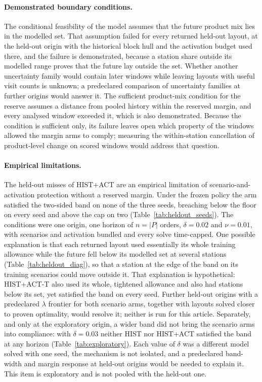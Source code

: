 \paragraph{Demonstrated boundary conditions.} The conditional feasibility of the model assumes that the future product mix lies in the modelled set. That assumption failed for every returned held-out layout, at the held-out origin with the historical block hull and the activation budget used there, and the failure is demonstrated, because a station share outside its modelled range proves that the future lay outside the set. Whether another uncertainty family would contain later windows while leaving layouts with useful visit counts is unknown; a predeclared comparison of uncertainty families at further origins would answer it. The sufficient product-mix condition for the reserve assumes a distance from pooled history within the reserved margin, and every analysed window exceeded it, which is also demonstrated. Because the condition is sufficient only, its failure leaves open which property of the windows allowed the margin arms to comply; measuring the within-station cancellation of product-level change on scored windows would address that question.

\paragraph{Empirical limitations.} The held-out misses of HIST+ACT are an empirical limitation of scenario-and-activation protection without a reserved margin. Under the frozen policy the arm satisfied the two-sided band on none of the three seeds, breaching below the floor on every seed and above the cap on two (Table~\ref{tab:heldout_seeds}). The conditions were one origin, one horizon of $n=|P|$ orders, $\delta=0.02$ and $\nu=0.01$, with scenarios and activation bundled and every solve time-capped. One possible explanation is that each returned layout used essentially its whole training allowance while the future fell below its modelled set at several stations (Table~\ref{tab:heldout_diag}), so that a station at the edge of the band on its training scenarios could move outside it. That explanation is hypothetical: HIST+ACT-T also used its whole, tightened allowance and also had stations below its set, yet satisfied the band on every seed. Further held-out origins with a predeclared $\lambda$ frontier for both scenario arms, together with layouts solved closer to proven optimality, would resolve it; neither is run for this article. Separately, and only at the exploratory origin, a wider band did not bring the scenario arms into compliance: with $\delta=0.03$ neither HIST nor HIST+ACT satisfied the band at any horizon (Table~\ref{tab:exploratory}). Each value of $\delta$ was a different model solved with one seed, the mechanism is not isolated, and a predeclared band-width and margin response at held-out origins would be needed to explain it. This item is exploratory and is not pooled with the held-out one.

